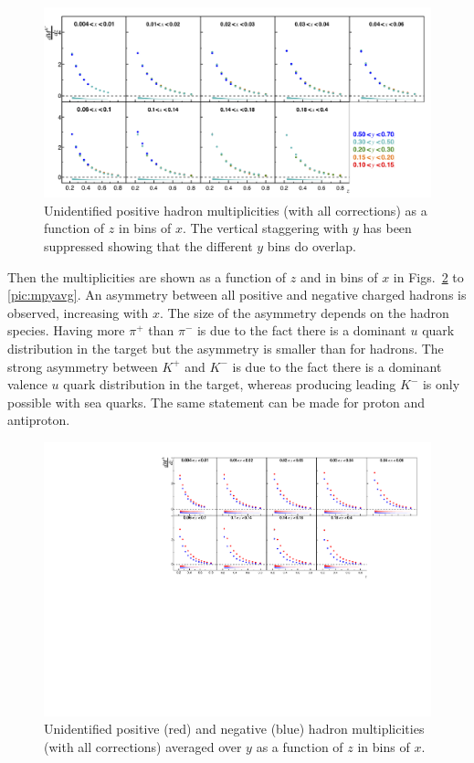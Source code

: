 \begin{figure}[!h]
  \centering
	\includegraphics[scale=0.85]{./gfx/hnoystag.png}
	\caption{Unidentified positive hadron multiplicities (with all corrections) as a function of $z$ in bins of $x$. The vertical staggering with $y$ has been suppressed showing that the different $y$ bins do overlap.}
	\label{pic:mhnoy}
\end{figure}

Then the multiplicities are shown as a function of $z$ and in bins of $x$ in Figs.~\ref{pic:mhyavg} to \ref{pic:mpyavg}. An asymmetry between all positive and negative charged hadrons is observed, increasing with $x$. The size of the asymmetry depends on the hadron species. Having more $\pi^+$ than $\pi^-$ is due to the fact there is a dominant $u$ quark distribution in the target but the asymmetry is smaller than for hadrons. The strong asymmetry between $K^+$ and $K^-$ is due to the fact there is a dominant valence $u$ quark distribution in the target, whereas producing leading  $K^-$ is only possible with sea quarks. The same statement can be made for proton and antiproton.

\begin{figure}[!h]
  \centering
	\includegraphics[scale=0.85]{./gfx/hyavg.pdf}
	\caption{Unidentified positive (red) and negative (blue) hadron multiplicities (with all corrections) averaged over $y$ as a function of $z$ in bins of $x$.}
	\label{pic:mhyavg}
\end{figure}

